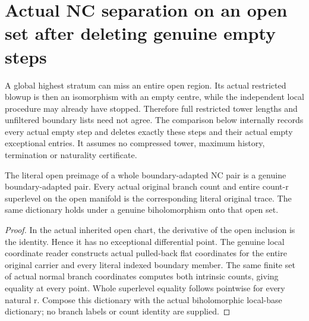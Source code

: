 \section{Actual NC separation on an open set after deleting genuine empty steps}
\label{sec:hironaka-normal-crossings-open-restriction-separation}

A global highest stratum can miss an entire open region. Its actual restricted
blowup is then an isomorphism with an empty centre, while the independent local
procedure may already have stopped. Therefore full restricted tower lengths
and unfiltered boundary lists need not agree. The comparison below internally
records every actual empty step and deletes exactly these steps and their actual
empty exceptional entries. It assumes no compressed tower, maximum history,
termination or naturality certificate.

\begin{lemma}
\label{hir:general-nc-open-original-intrinsic-count}
\leanok
The literal open preimage of a whole boundary-adapted NC pair is a genuine
boundary-adapted pair. Every actual original branch count and entire count-r
superlevel on the open manifold is the corresponding literal original trace.
The same dictionary holds under a genuine biholomorphism onto that open set.
\end{lemma}
\begin{proof}
In the actual inherited open chart, the derivative of the open inclusion is
the identity. Hence it has no exceptional differential point. The genuine
local coordinate reader constructs actual pulled-back flat coordinates for
the entire original carrier and every literal indexed boundary member. The
same finite set of actual normal branch coordinates computes both intrinsic
counts, giving equality at every point. Whole superlevel equality follows
pointwise for every natural r. Compose this dictionary with the actual
biholomorphic local-base dictionary; no branch labels or count identity are
supplied.
\end{proof}

